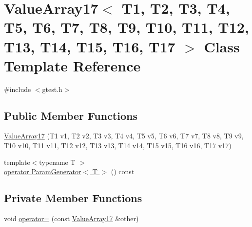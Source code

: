 \hypertarget{classtesting_1_1internal_1_1ValueArray17}{\section{\-Value\-Array17$<$ \-T1, \-T2, \-T3, \-T4, \-T5, \-T6, \-T7, \-T8, \-T9, \-T10, \-T11, \-T12, \-T13, \-T14, \-T15, \-T16, \-T17 $>$ \-Class \-Template \-Reference}
\label{df/d24/classtesting_1_1internal_1_1ValueArray17}
}


{\ttfamily \#include $<$gtest.\-h$>$}

\subsection*{\-Public \-Member \-Functions}
\begin{DoxyCompactItemize}
\item 
\hyperlink{classtesting_1_1internal_1_1ValueArray17_aa68404cbf4355331a45ba23c7b1b920c}{\-Value\-Array17} (\-T1 v1, \-T2 v2, \-T3 v3, \-T4 v4, \-T5 v5, \-T6 v6, \-T7 v7, \-T8 v8, \-T9 v9, \-T10 v10, \-T11 v11, \-T12 v12, \-T13 v13, \-T14 v14, \-T15 v15, \-T16 v16, \-T17 v17)
\item 
{\footnotesize template$<$typename T $>$ }\\\hyperlink{classtesting_1_1internal_1_1ValueArray17_a08ef46fa12c9dd8ef6fc630baeea89b7}{operator Param\-Generator$<$ T $>$} () const 
\end{DoxyCompactItemize}
\subsection*{\-Private \-Member \-Functions}
\begin{DoxyCompactItemize}
\item 
void \hyperlink{classtesting_1_1internal_1_1ValueArray17_a35cda96d0e7404f9353538e63d667932}{operator=} (const \hyperlink{classtesting_1_1internal_1_1ValueArray17}{\-Value\-Array17} \&other)
\end{DoxyCompactItemize}
